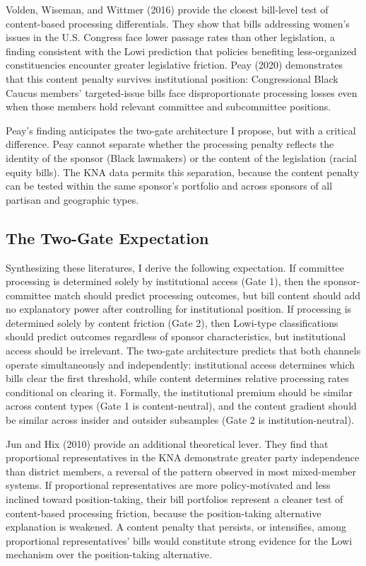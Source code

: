 \documentclass[11pt]{article}
\begin{document}
Volden, Wiseman, and Wittmer (2016) provide the closest bill-level test of content-based processing differentials. They show that bills addressing women's issues in the U.S. Congress face lower passage rates than other legislation, a finding consistent with the Lowi prediction that policies benefiting less-organized constituencies encounter greater legislative friction. Peay (2020) demonstrates that this content penalty survives institutional position: Congressional Black Caucus members' targeted-issue bills face disproportionate processing losses even when those members hold relevant committee and subcommittee positions.

Peay's finding anticipates the two-gate architecture I propose, but with a critical difference. Peay cannot separate whether the processing penalty reflects the identity of the sponsor (Black lawmakers) or the content of the legislation (racial equity bills). The KNA data permits this separation, because the content penalty can be tested within the same sponsor's portfolio and across sponsors of all partisan and geographic types.

\subsection{The Two-Gate Expectation}

Synthesizing these literatures, I derive the following expectation. If committee processing is determined solely by institutional access (Gate 1), then the sponsor-committee match should predict processing outcomes, but bill content should add no explanatory power after controlling for institutional position. If processing is determined solely by content friction (Gate 2), then Lowi-type classifications should predict outcomes regardless of sponsor characteristics, but institutional access should be irrelevant. The two-gate architecture predicts that both channels operate simultaneously and independently: institutional access determines which bills clear the first threshold, while content determines relative processing rates conditional on clearing it. Formally, the institutional premium should be similar across content types (Gate 1 is content-neutral), and the content gradient should be similar across insider and outsider subsamples (Gate 2 is institution-neutral).

Jun and Hix (2010) provide an additional theoretical lever. They find that proportional representatives in the KNA demonstrate greater party independence than district members, a reversal of the pattern observed in most mixed-member systems. If proportional representatives are more policy-motivated and less inclined toward position-taking, their bill portfolios represent a cleaner test of content-based processing friction, because the position-taking alternative explanation is weakened. A content penalty that persists, or intensifies, among proportional representatives' bills would constitute strong evidence for the Lowi mechanism over the position-taking alternative.
\end{document}
